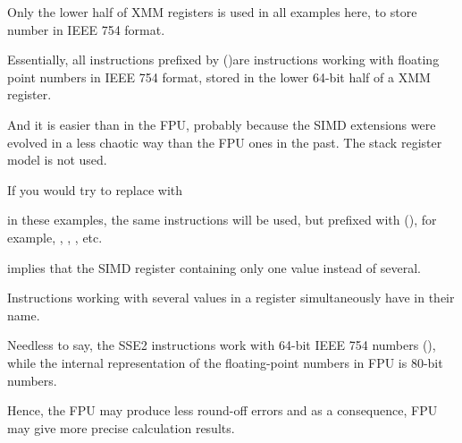 Only the lower half of XMM registers is used in all examples here, 
to store number in IEEE 754 format.

Essentially, all instructions prefixed by 
 ()\EMDASH{}are instructions working with floating point numbers
in IEEE 754 format, stored in the lower 64-bit half of a XMM register.

And it is easier than in the FPU, probably because the SIMD extensions 
were evolved in a less chaotic way than the FPU ones in the past.
The stack register model is not used.

If you would try to replace \Tdouble with \Tfloat

in these examples, the same instructions will be used, but prefixed with  
(), for example, , , , etc.

implies that the SIMD register containing only one value instead of several.

Instructions working with several values in a register simultaneously have  in their name.

Needless to say, the SSE2 instructions work with 64-bit IEEE 754 numbers (\Tdouble),
while the internal representation of the floating-point numbers in FPU is 80-bit numbers.

Hence, the FPU may produce less round-off errors and as a consequence, FPU may give more precise
calculation results.
